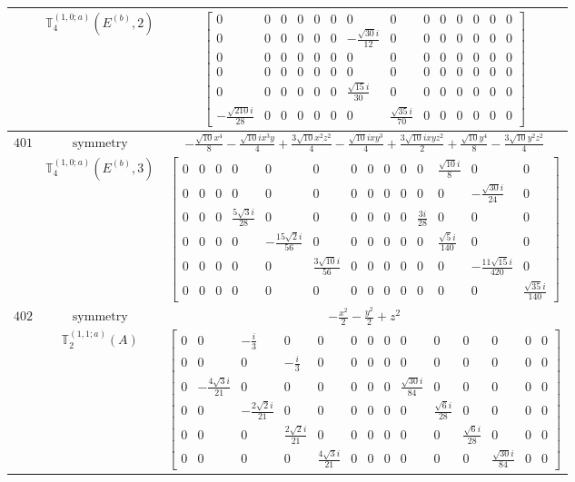 \documentclass[fleqn,8pt,landscape]{jsarticle}
\begin{document}
\begin{longtable}{ccc}
$  $ & $ \mathbb{T}_{4}^{(1,0;a)}(E^{(b)},2) $ & $ \begin{bmatrix} 0 & 0 & 0 & 0 & 0 & 0 & 0 & 0 & 0 & 0 & 0 & 0 & 0 & 0 \\ 0 & 0 & 0 & 0 & 0 & 0 & - \frac{\sqrt{30} i}{12} & 0 & 0 & 0 & 0 & 0 & 0 & 0 \\ 0 & 0 & 0 & 0 & 0 & 0 & 0 & 0 & 0 & 0 & 0 & 0 & 0 & 0 \\ 0 & 0 & 0 & 0 & 0 & 0 & 0 & 0 & 0 & 0 & 0 & 0 & 0 & 0 \\ 0 & 0 & 0 & 0 & 0 & 0 & \frac{\sqrt{15} i}{30} & 0 & 0 & 0 & 0 & 0 & 0 & 0 \\ - \frac{\sqrt{210} i}{28} & 0 & 0 & 0 & 0 & 0 & 0 & \frac{\sqrt{35} i}{70} & 0 & 0 & 0 & 0 & 0 & 0 \end{bmatrix} $ \\ \hline
$ 401 $ & $ \text{symmetry} $ & $ - \frac{\sqrt{10} x^{4}}{8} - \frac{\sqrt{10} i x^{3} y}{4} + \frac{3 \sqrt{10} x^{2} z^{2}}{4} - \frac{\sqrt{10} i x y^{3}}{4} + \frac{3 \sqrt{10} i x y z^{2}}{2} + \frac{\sqrt{10} y^{4}}{8} - \frac{3 \sqrt{10} y^{2} z^{2}}{4} $ \\
$  $ & $ \mathbb{T}_{4}^{(1,0;a)}(E^{(b)},3) $ & $ \begin{bmatrix} 0 & 0 & 0 & 0 & 0 & 0 & 0 & 0 & 0 & 0 & 0 & \frac{\sqrt{10} i}{8} & 0 & 0 \\ 0 & 0 & 0 & 0 & 0 & 0 & 0 & 0 & 0 & 0 & 0 & 0 & - \frac{\sqrt{30} i}{24} & 0 \\ 0 & 0 & 0 & \frac{5 \sqrt{3} i}{28} & 0 & 0 & 0 & 0 & 0 & 0 & \frac{3 i}{28} & 0 & 0 & 0 \\ 0 & 0 & 0 & 0 & - \frac{15 \sqrt{2} i}{56} & 0 & 0 & 0 & 0 & 0 & 0 & \frac{\sqrt{5} i}{140} & 0 & 0 \\ 0 & 0 & 0 & 0 & 0 & \frac{3 \sqrt{10} i}{56} & 0 & 0 & 0 & 0 & 0 & 0 & - \frac{11 \sqrt{15} i}{420} & 0 \\ 0 & 0 & 0 & 0 & 0 & 0 & 0 & 0 & 0 & 0 & 0 & 0 & 0 & \frac{\sqrt{35} i}{140} \end{bmatrix} $ \\ \hline
$ 402 $ & $ \text{symmetry} $ & $ - \frac{x^{2}}{2} - \frac{y^{2}}{2} + z^{2} $ \\
$  $ & $ \mathbb{T}_{2}^{(1,1;a)}(A) $ & $ \begin{bmatrix} 0 & 0 & - \frac{i}{3} & 0 & 0 & 0 & 0 & 0 & 0 & 0 & 0 & 0 & 0 & 0 \\ 0 & 0 & 0 & - \frac{i}{3} & 0 & 0 & 0 & 0 & 0 & 0 & 0 & 0 & 0 & 0 \\ 0 & - \frac{4 \sqrt{3} i}{21} & 0 & 0 & 0 & 0 & 0 & 0 & \frac{\sqrt{30} i}{84} & 0 & 0 & 0 & 0 & 0 \\ 0 & 0 & - \frac{2 \sqrt{2} i}{21} & 0 & 0 & 0 & 0 & 0 & 0 & \frac{\sqrt{6} i}{28} & 0 & 0 & 0 & 0 \\ 0 & 0 & 0 & \frac{2 \sqrt{2} i}{21} & 0 & 0 & 0 & 0 & 0 & 0 & \frac{\sqrt{6} i}{28} & 0 & 0 & 0 \\ 0 & 0 & 0 & 0 & \frac{4 \sqrt{3} i}{21} & 0 & 0 & 0 & 0 & 0 & 0 & \frac{\sqrt{30} i}{84} & 0 & 0 \end{bmatrix} $ \\ \hline

\end{longtable}
\end{document}

